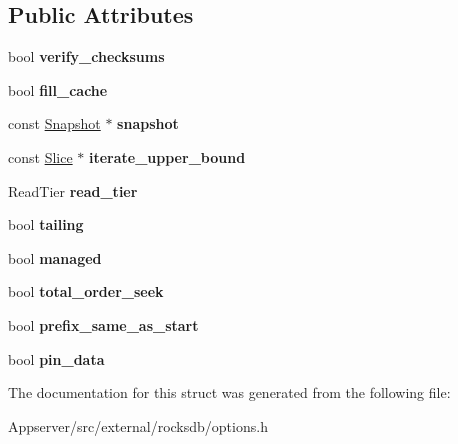\subsection*{Public Attributes}
\begin{DoxyCompactItemize}
\item 
bool {\bfseries verify\+\_\+checksums}\hypertarget{structrocksdb_1_1ReadOptions_aa31fd949ed2f3e4241ce705b2f3d8792}{}\label{structrocksdb_1_1ReadOptions_aa31fd949ed2f3e4241ce705b2f3d8792}

\item 
bool {\bfseries fill\+\_\+cache}\hypertarget{structrocksdb_1_1ReadOptions_a5f5c09191f14704ad67f6afd25048db9}{}\label{structrocksdb_1_1ReadOptions_a5f5c09191f14704ad67f6afd25048db9}

\item 
const \hyperlink{classrocksdb_1_1Snapshot}{Snapshot} $\ast$ {\bfseries snapshot}\hypertarget{structrocksdb_1_1ReadOptions_aac7095086f2c47402801196ae0481568}{}\label{structrocksdb_1_1ReadOptions_aac7095086f2c47402801196ae0481568}

\item 
const \hyperlink{classrocksdb_1_1Slice}{Slice} $\ast$ {\bfseries iterate\+\_\+upper\+\_\+bound}\hypertarget{structrocksdb_1_1ReadOptions_a95fe517687c5bcb1b38236abaa7ed50f}{}\label{structrocksdb_1_1ReadOptions_a95fe517687c5bcb1b38236abaa7ed50f}

\item 
Read\+Tier {\bfseries read\+\_\+tier}\hypertarget{structrocksdb_1_1ReadOptions_a49309fa38e5e12ed82cccfd8e6632932}{}\label{structrocksdb_1_1ReadOptions_a49309fa38e5e12ed82cccfd8e6632932}

\item 
bool {\bfseries tailing}\hypertarget{structrocksdb_1_1ReadOptions_ae0b90a77081d2e243a6fdc38404b2aad}{}\label{structrocksdb_1_1ReadOptions_ae0b90a77081d2e243a6fdc38404b2aad}

\item 
bool {\bfseries managed}\hypertarget{structrocksdb_1_1ReadOptions_a8a79ccb755f4db9354f92df555574727}{}\label{structrocksdb_1_1ReadOptions_a8a79ccb755f4db9354f92df555574727}

\item 
bool {\bfseries total\+\_\+order\+\_\+seek}\hypertarget{structrocksdb_1_1ReadOptions_aa9df46ef9d34fbb7e68eee9b2d440aeb}{}\label{structrocksdb_1_1ReadOptions_aa9df46ef9d34fbb7e68eee9b2d440aeb}

\item 
bool {\bfseries prefix\+\_\+same\+\_\+as\+\_\+start}\hypertarget{structrocksdb_1_1ReadOptions_a2b61dceeeb8f640025f1f257065520f1}{}\label{structrocksdb_1_1ReadOptions_a2b61dceeeb8f640025f1f257065520f1}

\item 
bool {\bfseries pin\+\_\+data}\hypertarget{structrocksdb_1_1ReadOptions_af31928d64e04efe750f81cb03cfa7758}{}\label{structrocksdb_1_1ReadOptions_af31928d64e04efe750f81cb03cfa7758}

\end{DoxyCompactItemize}


The documentation for this struct was generated from the following file\+:\begin{DoxyCompactItemize}
\item 
Appserver/src/external/rocksdb/options.\+h\end{DoxyCompactItemize}
